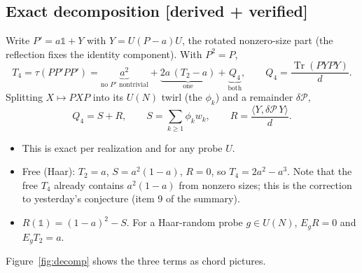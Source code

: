 \documentclass[11pt]{article}
\newcommand{\Tr}{\operatorname{Tr}}
\newcommand{\one}{\mathds 1}
\newcommand{\tagbox}[2]{\textsf{\small\color{#1}[#2]}}
\newcommand{\VER}{\tagbox{cder}{derived + verified}}
\theoremstyle{remark}
\begin{document}
\subsection{Exact decomposition \VER}
Write $P'=a\one+Y$ with $Y=U(P-a)U$, the rotated nonzero-size part (the reflection fixes the identity component).
With $P^2=P$,
\begin{equation}
T_4=\tau(PP'PP')=\underbrace{a^2}_{\text{no }P'\text{ nontrivial}}+\underbrace{2a\,(T_2-a)}_{\text{one}}+\underbrace{Q_4}_{\text{both}},\qquad Q_4=\frac{\Tr(PYPY)}{d}.
\end{equation}
Splitting $X\mapsto PXP$ into its $U(N)$ twirl (the $\phi_k$) and a remainder $\delta\mathcal P$,
\begin{equation}
Q_4=S+R,\qquad S=\sum_{k\ge1}\phi_kw_k,\qquad R=\frac{\langle Y,\delta\mathcal P\,Y\rangle}{d}.
\end{equation}
\begin{itemize}\itemsep1pt
\item This is exact per realization and for any probe $U$.
\item Free (Haar): $T_2=a$, $S=a^2(1-a)$, $R=0$, so $T_4=2a^2-a^3$. Note that the free $T_4$ already contains
  $a^2(1-a)$ from nonzero sizes; this is the correction to yesterday's conjecture (item 9 of the summary).
\item $R(\one)=(1-a)^2-S$. For a Haar-random probe $g\in U(N)$, $E_gR=0$ and $E_gT_2=a$.
\end{itemize}
Figure~\ref{fig:decomp} shows the three terms as chord pictures.
\end{document}
